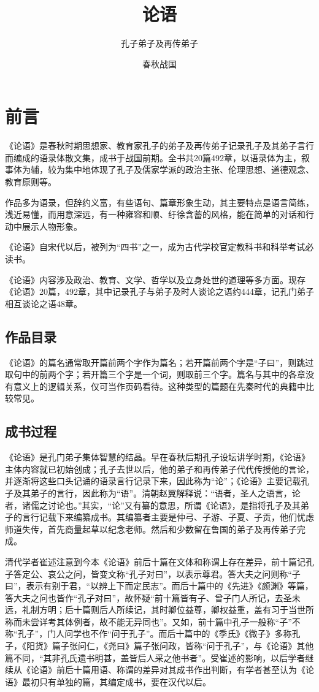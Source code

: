 \documentclass[a4paper,12pt,UTF8,twoside]{ctexbook}
\title{\heiti\zihao{0} 论语}
\author{孔子弟子及再传弟子}
\date{春秋战国}
\begin{document}
\maketitle
\tableofcontents

\frontmatter
\chapter{前言}

《论语》是春秋时期思想家、教育家孔子的弟子及再传弟子记录孔子及其弟子言行而编成的语录体散文集，成书于战国前期。全书共20篇492章，以语录体为主，叙事体为辅，较为集中地体现了孔子及儒家学派的政治主张、伦理思想、道德观念、教育原则等。

作品多为语录，但辞约义富，有些语句、篇章形象生动，其主要特点是语言简练，浅近易懂，而用意深远，有一种雍容和顺、纡徐含蓄的风格，能在简单的对话和行动中展示人物形象。

《论语》自宋代以后，被列为“四书”之一，成为古代学校官定教科书和科举考试必读书。

《论语》内容涉及政治、教育、文学、哲学以及立身处世的道理等多方面。现存《论语》20篇，492章，其中记录孔子与弟子及时人谈论之语约444章，记孔门弟子相互谈论之语48章。

\section{作品目录}

《论语》的篇名通常取开篇前两个字作为篇名；若开篇前两个字是“子曰”，则跳过取句中的前两个字；若开篇三个字是一个词，则取前三个字。篇名与其中的各章没有意义上的逻辑关系，仅可当作页码看待。这种类型的篇题在先秦时代的典籍中比较常见。

\section{成书过程}

《论语》是孔门弟子集体智慧的结晶。早在春秋后期孔子设坛讲学时期，《论语》主体内容就已初始创成；孔子去世以后，他的弟子和再传弟子代代传授他的言论，并逐渐将这些口头记诵的语录言行记录下来，因此称为“论”；《论语》主要记载孔子及其弟子的言行，因此称为“语”。清朝赵翼解释说：“语者，圣人之语言，论者，诸儒之讨论也。”其实，“论”又有纂的意思，所谓《论语》，是指将孔子及其弟子的言行记载下来编纂成书。其编纂者主要是仲弓、子游、子夏、子贡，他们忧虑师道失传，首先商量起草以纪念老师。然后和少数留在鲁国的弟子及再传弟子完成。

清代学者崔述注意到今本《论语》前后十篇在文体和称谓上存在差异，前十篇记孔子答定公、哀公之问，皆变文称“孔子对曰”，以表示尊君。答大夫之问则称“子曰”，表示有别于君，“以辨上下而定民志”。而后十篇中的《先进》《颜渊》等篇，答大夫之问也皆作“孔子对曰”，故怀疑“前十篇皆有子、曾子门人所记，去圣未远，礼制方明；后十篇则后人所续记，其时卿位益尊，卿权益重，盖有习于当世所称而未尝详考其体例者，故不能无异同也”。又如，前十篇中孔子一般称“子”不称“孔子”，门人问学也不作“问于孔子”。而后十篇中的《季氏》《微子》多称孔子，《阳货》篇子张问仁，《尧曰》篇子张问政，皆称“问于孔子”，与《论语》其他篇不同，“其非孔氏遗书明甚，盖皆后人采之他书者”。受崔述的影响，以后学者继续从《论语》前后十篇用语、称谓的差异对其成书作出判断，有学者甚至认为《论语》最初只有单独的篇，其编定成书，要在汉代以后。
\end{document}
